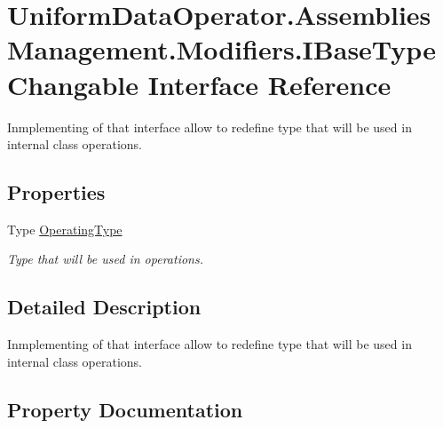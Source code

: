 \hypertarget{interface_uniform_data_operator_1_1_assemblies_management_1_1_modifiers_1_1_i_base_type_changable}{}\section{Uniform\+Data\+Operator.\+Assemblies\+Management.\+Modifiers.\+I\+Base\+Type\+Changable Interface Reference}
\label{interface_uniform_data_operator_1_1_assemblies_management_1_1_modifiers_1_1_i_base_type_changable}


Inmplementing of that interface allow to redefine type that will be used in internal class operations.  


\subsection*{Properties}
\begin{DoxyCompactItemize}
\item 
Type \mbox{\hyperlink{interface_uniform_data_operator_1_1_assemblies_management_1_1_modifiers_1_1_i_base_type_changable_abd6ebc983b5489d21dfdcc8d43a887f3}{Operating\+Type}}
\begin{DoxyCompactList}\small\item\em Type that will be used in operations. \end{DoxyCompactList}\end{DoxyCompactItemize}


\subsection{Detailed Description}
Inmplementing of that interface allow to redefine type that will be used in internal class operations. 



\subsection{Property Documentation}
\mbox{\label{interface_uniform_data_operator_1_1_assemblies_management_1_1_modifiers_1_1_i_base_type_changable_abd6ebc983b5489d21dfdcc8d43a887f3}} 
